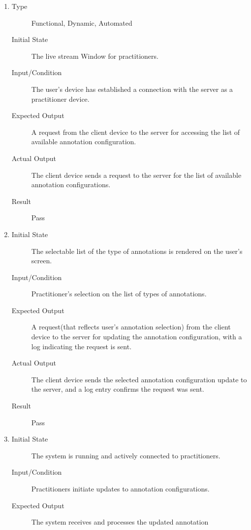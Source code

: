 \documentclass[12pt, titlepage]{article}
\begin{document}
\begin{enumerate}[FR-T1]
  \item \label{FRT4}
    \begin{description}
    \item[Type] Functional, Dynamic, Automated
    \item[Initial State] The live stream Window for practitioners.
    \item[Input/Condition] The user’s device has established a connection with the
      server as a practitioner device.
    \item[Expected Output] A request from the client device to the server for
      accessing the list of available annotation configuration.
    \item[Actual Output] The client device sends a request to the server for the
      list of available annotation configurations.
    \item[Result] Pass
    \end{description}
  \item \label{FRT5}
    \begin{description}
    \item[Initial State] The selectable list of the type of annotations is
      rendered on the user's screen.
    \item[Input/Condition] Practitioner’s selection on the list of types of
      annotations.
    \item[Expected Output] A request(that reflects user’s annotation selection)
      from the client device to the server for updating the annotation
      configuration, with a log indicating the request is sent.
    \item[Actual Output] The client device sends the selected annotation
      configuration update to the server, and a log entry confirms the request
      was sent.
    \item[Result] Pass
    \end{description}
  \item \label{FRT6}
    \begin{description}
    \item[Initial State] The system is running and actively connected to
      practitioners.
    \item[Input/Condition] Practitioners initiate updates to annotation
      configurations.
    \item[Expected Output] The system receives and processes the updated annotation

\end{description}
\end{enumerate}
\end{document}

